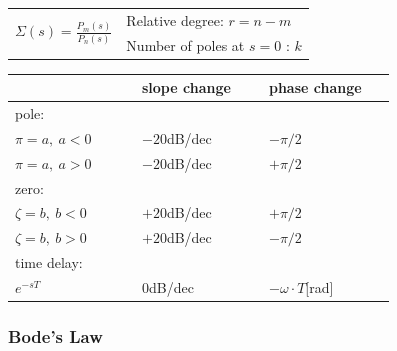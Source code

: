 \documentclass[10pt,a4paper]{scrartcl}
\begin{document}
\begin{multicols*}{3}
\begin{enumerate}
	\end{enumerate}	
	
	\begin{tabular}{ll}
	\multirow{2}{0.45\linewidth}{\Large$\Sigma(s)=\frac{P_m(s)}{P_n(s)}$\normalsize}&Relative degree: $r=n-m$\\
	&Number of poles at $s=0$ : $k$\\
	\end{tabular}
	
	
	
	\begin{tabular}{p{0.29\linewidth}|p{0.29\linewidth}|p{0.29\linewidth}}
	&slope change&phase change\\
	\hline
	pole:&&\\
	\hline
	\hline
	$\pi=a,\ a<0$&$-20$dB/dec&$-\pi/2$\\
	$\pi=a,\ a>0$&$-20$dB/dec&$+\pi/2$\\
	\hline
	zero:&&\\
	\hline
	\hline
	$\zeta=b,\ b<0$&$+20$dB/dec&$+\pi/2$\\
	$\zeta=b,\ b>0$&$+20$dB/dec&$-\pi/2$\\
	\hline
	time delay:&&\\
	\hline
	\hline
	$e^{-sT}$&$0$dB/dec&$-\omega\cdot T $[rad]\\
	\hline
	\end{tabular}	
	
	\subsubsection{Bode's Law}
	
	
	
	

\end{multicols*}
\end{document}
